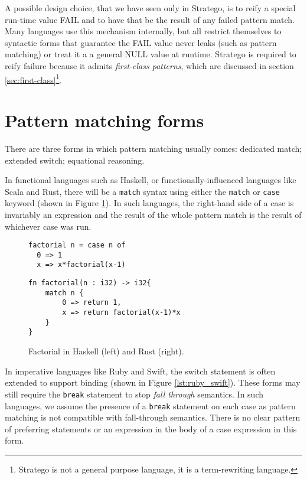 \documentclass[acmsmall]{acmart}
\begin{document}
A possible design choice, that we have seen only in Stratego, is to reify a special run-time value FAIL and to have that be the result of any failed pattern match.  Many languages use this mechanism internally, but all restrict themselves to syntactic forms that guarantee the FAIL value never leaks (such as pattern matching) or treat it a a general NULL value at runtime.  Stratego is required to reify failure because it admits \emph{first-class patterns}, which are discussed in section \ref{sec:first-class}\footnote{Stratego is not a general purpose language, it is a term-rewriting language.}.

\section{Pattern matching forms}
There are three forms in which pattern matching usually comes: dedicated match; extended switch; equational reasoning.

In functional languages such as Haskell, or functionally-influenced languages like Scala and Rust, there will be a \lstinline{match} syntax using either the \lstinline{match} or \lstinline{case} keyword (shown in Figure \ref{lst:haskell_rust}).  In such languages, the right-hand side of a case is invariably an expression and the result of the whole pattern match is the result of whichever case was run.

\begin{figure}
\hspace{-2em}
\begin{minipage}[t]{0.35\linewidth}
\begin{lstlisting}
factorial n = case n of
  0 => 1
  x => x*factorial(x-1)    
\end{lstlisting}
\end{minipage}\hspace{2em}
\begin{minipage}[t]{0.55\linewidth}
\begin{lstlisting}
fn factorial(n : i32) -> i32{
    match n {
        0 => return 1,
        x => return factorial(x-1)*x
    }
}
\end{lstlisting}
\end{minipage}
\caption{Factorial in Haskell (left) and Rust (right).}
\label{lst:haskell_rust}
\end{figure}

In imperative languages like Ruby and Swift, the switch statement is often extended to support binding (shown in Figure \ref{lst:ruby_swift}).  These forms may still require the \lstinline{break} statement to stop \emph{fall through} semantics.  In such languages, we assume the presence of a \lstinline{break} statement on each case as pattern matching is not compatible with fall-through semantics.  There is no clear pattern of preferring statements or an expression in the body of a case expression in this form.
\end{document}
